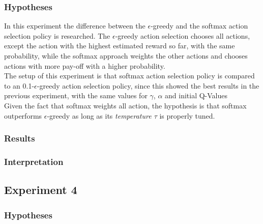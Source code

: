 \documentclass[11pt]{article}
\begin{document}
\subsubsection{Hypotheses}
In this experiment the difference between the $\epsilon$-greedy and the softmax action selection policy is researched. The $\epsilon$-greedy action selection chooses all actions, except the action with the highest estimated reward so far, with the same probability, while the softmax approach weights the other actions and chooses actions with more pay-off with a higher probability.\\
The setup of this experiment is that softmax action selection policy is compared to an 0.1-$\epsilon$-greedy action selection policy, since this showed the best results in the previous experiment, with the same values for $\gamma$, $\alpha$ and initial Q-Values\\
Given the fact that softmax weights all action, the hypothesis is that softmax outperforms $\epsilon$-greedy as long as its \emph{temperature $\tau$} is properly tuned.
\subsubsection{Results}


\subsubsection{Interpretation}


\subsubsection{}

\subsection{Experiment 4}

\subsubsection{Hypotheses}
\end{document}
